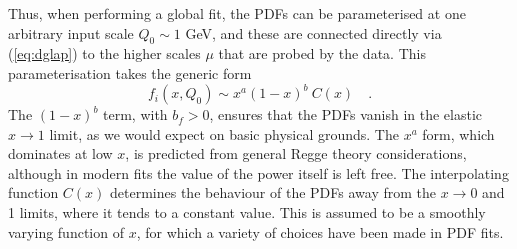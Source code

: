 Thus, when performing a global fit, the PDFs can be parameterised at one arbitrary input scale $Q_0\sim 1$ GeV, and these are connected directly via (\ref{eq:dglap}) to the higher scales $\mu$ that are probed by the data.
%
%
%
%
This parameterisation takes the generic form
\begin{equation}\label{eq:pdffunc}
f_{i}(x,Q_0)\sim x^{a}(1-x)^{b}\:C(x)\quad.
\end{equation}
The $(1-x)^b$ term, with $b_{f}>0$, ensures that the PDFs vanish in the elastic $x\to 1$ limit, as we would expect on basic physical grounds. 
The $x^a$ form, which dominates at low $x$, is predicted from general Regge theory considerations, although in modern fits the value of the power itself is left free. The interpolating function $C(x)$ determines the behaviour of the PDFs away from the $x\to 0$ and 1 limits, where it tends to a constant value. This is assumed to be a smoothly varying function of $x$, for which a variety of choices have been made in PDF fits.


